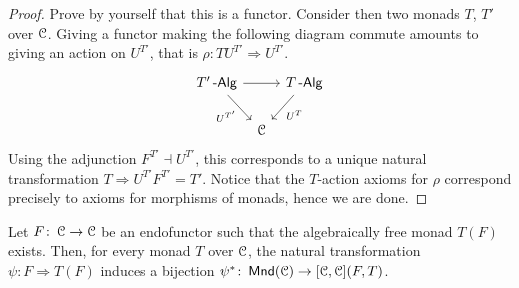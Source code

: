 \documentclass[a4paper,11pt,oneside,openany]{scrbook}
\begin{document}
\begin{proof}
	Prove by yourself that this is a functor. Consider then two monads $T$, $T'$ over $\operatorname{\mathcal{C}}$. Giving a functor making the following diagram commute amounts to giving an action on $U^{T'}$, that is $\rho\colon TU^{T'}\Rightarrow U^{T'}$.
	\[
		\begin{tikzcd}[column sep=tiny]
			T'\Alg\ar[rr]\ar[dr, swap, "U^{T'}"]
			&& T\Alg\ar[dl, "U^T"] \\
			& \C
		\end{tikzcd}
	\]
	Using the adjunction $F^{T'}\dashv U^{T'}$, this corresponds to a unique natural transformation $T\Rightarrow U^{T'}F^{T'}=T'$. Notice that the $T$-action axioms for $\rho$ correspond precisely to axioms for morphisms of monads, hence we are done.
\end{proof}

\begin{prop}
	Let $F\colon\operatorname{\mathcal{C}}\rightarrow\operatorname{\mathcal{C}}$ be an endofunctor such that the algebraically free monad $T(F)$ exists. Then, for every monad $T$ over $\operatorname{\mathcal{C}}$, the natural transformation $\psi\colon F\Rightarrow T(F)$ induces a bijection $\psi^*\colon\operatorname{\mathsf{Mnd}}(\operatorname{\mathcal{C}})\rightarrow [\operatorname{\mathcal{C}},\operatorname{\mathcal{C}}](F,T)$.
\end{prop}
\end{document}
